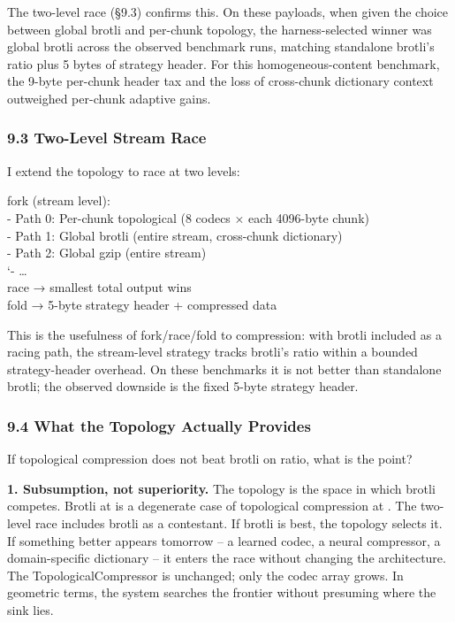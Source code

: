 \documentclass[
]{article}
\begin{document}
The two-level race (§9.3) confirms this. On these payloads, when given
the choice between global brotli and per-chunk topology, the
harness-selected winner was global brotli across the observed benchmark
runs, matching standalone brotli's ratio plus 5 bytes of strategy
header. For this homogeneous-content benchmark, the 9-byte per-chunk
header tax and the loss of cross-chunk dictionary context outweighed
per-chunk adaptive gains.

\subsubsection{\texorpdfstring{\textbf{9.3 Two-Level Stream
Race}}{9.3 Two-Level Stream Race}}\label{two-level-stream-race}

I extend the topology to race at two levels:

fork (stream level):\\
\textbar- Path 0: Per-chunk topological (8 codecs × each 4096-byte
chunk)\\
\textbar- Path 1: Global brotli (entire stream, cross-chunk
dictionary)\\
\textbar- Path 2: Global gzip (entire stream)\\
`- \ldots{}\\
race → smallest total output wins\\
fold → 5-byte strategy header + compressed data

This is the usefulness of fork/race/fold to compression: with brotli
included as a racing path, the stream-level strategy tracks brotli's
ratio within a bounded strategy-header overhead. On these benchmarks it
is not better than standalone brotli; the observed downside is the fixed
5-byte strategy header.

\subsubsection{\texorpdfstring{\textbf{9.4 What the Topology Actually
Provides}}{9.4 What the Topology Actually Provides}}\label{what-the-topology-actually-provides}

If topological compression does not beat brotli on ratio, what is the
point?

\textbf{1. Subsumption, not superiority.} The topology is the space in
which brotli competes. Brotli at is a degenerate case of topological
compression at . The two-level race includes brotli as a contestant. If
brotli is best, the topology selects it. If something better appears
tomorrow -- a learned codec, a neural compressor, a domain-specific
dictionary -- it enters the race without changing the architecture. The
TopologicalCompressor is unchanged; only the codec array grows. In
geometric terms, the system searches the frontier without presuming
where the sink lies.
\end{document}
